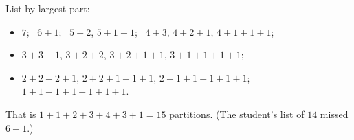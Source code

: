 List by largest part:
\begin{itemize}
\item $7$; \ $6+1$; \ $5+2$, $5+1+1$; \ $4+3$, $4+2+1$, $4+1+1+1$;
\item $3+3+1$, $3+2+2$, $3+2+1+1$, $3+1+1+1+1$;
\item $2+2+2+1$, $2+2+1+1+1$, $2+1+1+1+1+1$; \ $1+1+1+1+1+1+1$.
\end{itemize}
That is $1+1+2+3+4+3+1=\boxed{15}$ partitions. (The student's list of $14$ missed $6+1$.)
